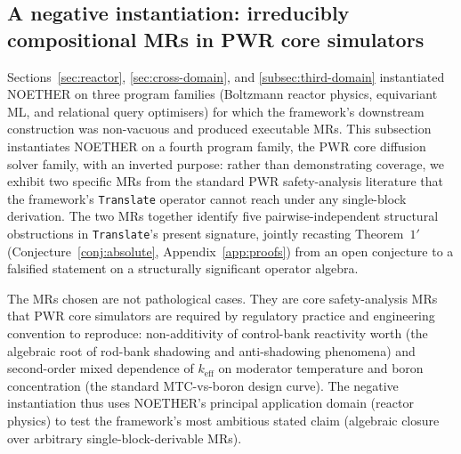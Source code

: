 \documentclass[manuscript]{acmart}
\begin{document}
\subsection{A negative instantiation: irreducibly compositional MRs in PWR core simulators}
\label{subsec:negative-pwr}

Sections~\ref{sec:reactor}, \ref{sec:cross-domain}, and \ref{subsec:third-domain} instantiated NOETHER on three program families (Boltzmann reactor physics, equivariant ML, and relational query optimisers) for which the framework's downstream construction was non-vacuous and produced executable MRs. This subsection instantiates NOETHER on a fourth program family, the PWR core diffusion solver family, with an inverted purpose: rather than demonstrating coverage, we exhibit two specific MRs from the standard PWR safety-analysis literature that the framework's \texttt{Translate} operator cannot reach under any single-block derivation. The two MRs together identify five pairwise-independent structural obstructions in \texttt{Translate}'s present signature, jointly recasting Theorem~$1'$ (Conjecture~\ref{conj:absolute}, Appendix~\ref{app:proofs}) from an open conjecture to a falsified statement on a structurally significant operator algebra.

The MRs chosen are not pathological cases. They are core safety-analysis MRs that PWR core simulators are required by regulatory practice and engineering convention to reproduce: non-additivity of control-bank reactivity worth (the algebraic root of rod-bank shadowing and anti-shadowing phenomena) and second-order mixed dependence of $k_{\mathrm{eff}}$ on moderator temperature and boron concentration (the standard MTC-vs-boron design curve). The negative instantiation thus uses NOETHER's principal application domain (reactor physics) to test the framework's most ambitious stated claim (algebraic closure over arbitrary single-block-derivable MRs).
\end{document}
